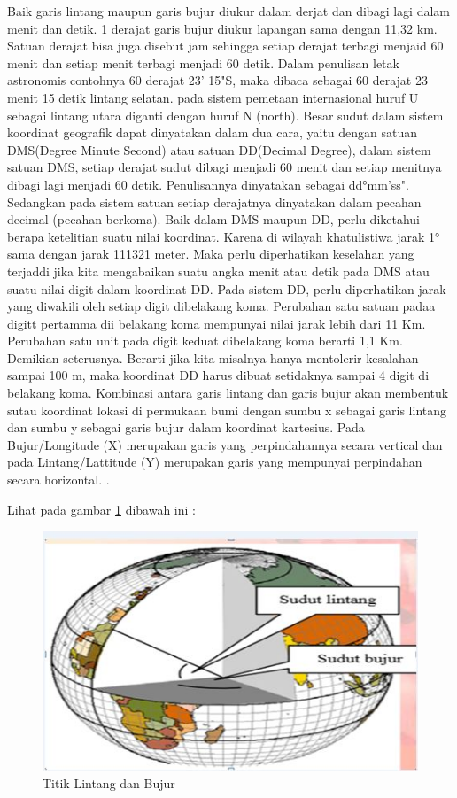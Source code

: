 Baik garis lintang maupun garis bujur diukur dalam derjat dan dibagi lagi dalam menit dan detik. 1 derajat garis bujur diukur lapangan sama dengan 11,32 km. Satuan derajat bisa juga disebut jam sehingga setiap derajat terbagi menjaid 60 menit dan setiap menit terbagi menjadi 60 detik. Dalam penulisan letak astronomis contohnya 60 derajat 23' 15"S, maka dibaca sebagai 60 derajat 23 menit 15 detik lintang selatan. pada sistem pemetaan internasional huruf U sebagai lintang utara diganti dengan huruf N (north). Besar sudut dalam sistem koordinat geografik dapat dinyatakan dalam dua cara, yaitu dengan satuan DMS(Degree Minute Second) atau satuan DD(Decimal Degree), dalam sistem satuan DMS, setiap derajat sudut dibagi menjadi 60 menit dan setiap menitnya dibagi lagi menjadi 60 detik. Penulisannya dinyatakan sebagai dd°mm'ss". Sedangkan pada sistem satuan setiap derajatnya dinyatakan dalam pecahan decimal (pecahan berkoma). Baik dalam DMS maupun DD, perlu diketahui berapa ketelitian suatu nilai koordinat. Karena di wilayah khatulistiwa jarak 1° sama dengan jarak 111321 meter. Maka perlu diperhatikan keselahan yang terjaddi jika kita mengabaikan suatu angka menit atau detik pada DMS atau suatu nilai digit dalam koordinat DD. Pada sistem DD, perlu diperhatikan jarak yang diwakili oleh setiap digit dibelakang koma. Perubahan satu satuan padaa digitt pertamma dii belakang koma mempunyai nilai jarak lebih dari 11 Km. Perubahan satu unit pada digit keduat dibelakang koma berarti 1,1 Km. Demikian seterusnya. Berarti jika kita misalnya hanya mentolerir kesalahan sampai 100 m, maka koordinat DD harus dibuat setidaknya sampai 4 digit di belakang koma. Kombinasi antara garis lintang dan garis bujur akan membentuk sutau koordinat lokasi di permukaan bumi dengan sumbu x sebagai garis lintang dan sumbu y sebagai garis bujur dalam koordinat kartesius. Pada Bujur/Longitude (X) merupakan garis yang perpindahannya secara vertical dan pada Lintang/Lattitude (Y) merupakan garis yang mempunyai perpindahan secara horizontal. \cite{zuhdi2012sistem}.

Lihat pada gambar \ref{lintangbujur} dibawah ini :
\begin{figure}[ht]
	\centerline{\includegraphics[width=1\textwidth]{figures/lintangbujur.JPG}}
	\caption{Titik Lintang dan Bujur}
	\label{lintangbujur}
	\end{figure}

